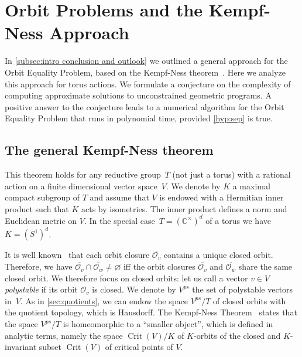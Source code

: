 \documentclass[a4paper,USenglish,cleveref,numberwithinsect]{lipics-v2021}
\DeclareMathOperator{\Crit}{Crit}
\newcommand{\CC}{\mathbb{C}}
\newcommand{\OO}{\ensuremath{\mathcal{O}}}
\numberwithin{equation}{section}
\begin{document}
\section{Orbit Problems and the Kempf-Ness Approach}\label{sec:kempf-ness}
In \cref{subsec:intro conclusion and outlook} we outlined a general approach for
the Orbit Equality Problem,
based on the Kempf-Ness theorem~\cite{kempfness}.
Here we analyze this approach for torus actions.
We formulate a conjecture on the complexity of computing approximate solutions to unconstrained geometric programs.
A positive answer to the conjecture leads to a numerical algorithm for the Orbit Equality Problem  %
that runs in polynomial time, provided \cref{hyp:sep} is true.


\subsection{The general Kempf-Ness theorem}
This theorem holds for any reductive group~$T$
(not just a torus) with a rational action on a finite dimensional vector space~$V$.
We denote by $K$ a maximal compact subgroup of $T$ and assume that $V$
is endowed with a Hermitian inner product such that $K$ acts by isometries.
The inner product defines a norm and Euclidean metric on $V$.
In the special case~$T=(\CC^\times)^d$ of a torus we have $K=(S^1)^d$.

It is well known~\cite[Thm.~2.3.6]{derksen-kemper}
that each orbit closure $\overline{\OO_v}$ contains a unique closed orbit.
Therefore, we have
$\overline{\OO_v}\cap\overline{\OO_w}\neq\varnothing$
iff the orbit closures $\overline{\OO_v}$ and $\overline{\OO_w}$ share the same closed orbit.
We therefore focus on closed orbits:
let us call a vector $v\in V$ \textit{polystable} if its orbit $\OO_v$ is closed.
We denote by $V^{ps}$ the set of polystable vectors in~$V$.
As in \cref{sec:quotients}, we can endow the space $V^{ps}/T$
of closed orbits with the quotient topology, which is Hausdorff.
The Kempf-Ness Theorem~\cite{kempfness}
states that the space $V^{ps}/T$ is homeomorphic to a ``smaller object'',
which is defined in analytic terms, namely the space $\Crit(V)/K$
of $K$-orbits of the closed and $K$-invariant subset $\Crit(V)$ of critical points of $V$.
\end{document}
